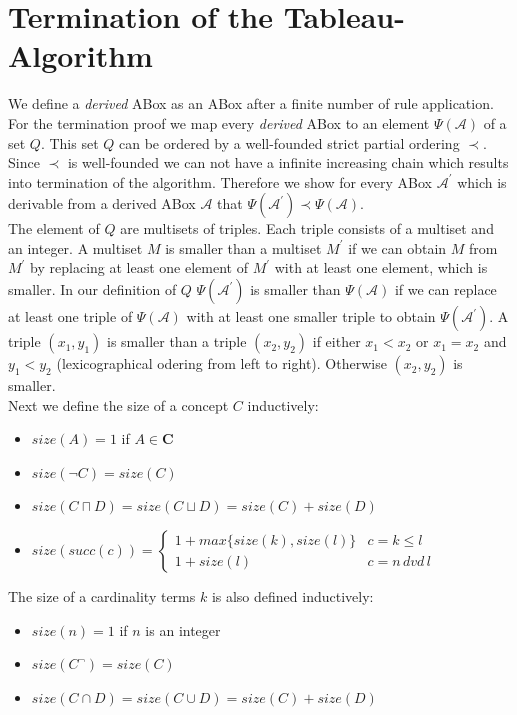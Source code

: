 \documentclass{book}
\theoremstyle{break}
\theoremstyle{definition}
\begin{document}
\section{Termination of the Tableau-Algorithm}
We define a \textit{derived} ABox as an ABox after a finite number of rule application. For the termination proof we map every \textit{derived} ABox to an element $\Psi(\mathcal{A})$ of a set $Q$. This set $Q$ can be ordered by a well-founded strict partial ordering $\prec$. Since $\prec$ is well-founded we can not have a infinite increasing chain which results into termination of the algorithm. Therefore we show for every ABox $\mathcal{A}^\prime$ which is derivable from a derived ABox $\mathcal{A}$ that $\Psi(\mathcal{A}^\prime)\prec\Psi(\mathcal{A})$.\\
The element of $Q$ are multisets of triples. Each triple consists of a multiset and an integer. A multiset $M$ is smaller than a multiset $M^\prime$ if we can obtain $M$ from $M^\prime$ by replacing at least one element of $M^\prime$ with at least one element, which is smaller. In our definition of $Q$ $\Psi(\mathcal{A}^\prime)$ is smaller than $\Psi(\mathcal{A})$ if we can replace at least one triple of $\Psi(\mathcal{A})$ with at least one smaller triple to obtain $\Psi(\mathcal{A}^\prime)$. A triple $(x_1,y_1)$ is smaller than a triple $(x_2,y_2)$ if either $x_1<x_2$ or $x_1=x_2$ and $y_1<y_2$ (lexicographical odering from left to right). Otherwise $(x_2,y_2)$ is smaller.\\
Next we define the size of a concept $C$ inductively:
\begin{itemize}
\item $size(A)=1$ if $A\in\mathbf{C}$
\item $size(\neg C)=size(C)$
\item $size(C\sqcap D)=size(C\sqcup D)= size(C)+ size(D)$
\item $size(succ(c))=\begin{cases}
1+max\{size(k),size(l)\} & c=k\leq l \\
1+size(l)& c= n\,dvd\,l
\end{cases}$
\end{itemize}
The size of a cardinality terms $k$ is also defined inductively:
\begin{itemize}
\item $size(n)=1$ if $n$ is an integer
\item $size(C^\neg)=size(C)$
\item $size(C\cap D)=size(C\cup D)= size(C)+ size(D)$
\end{itemize}
\end{document}
